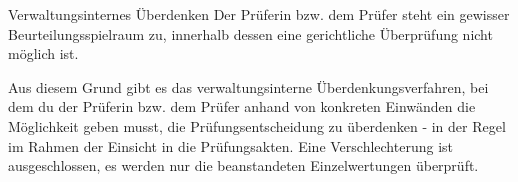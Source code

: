 \begin{artikel}{Verwaltungsinternes Überdenken}
Der Prüferin bzw. dem Prüfer steht ein gewisser Beurteilungsspielraum zu, innerhalb dessen eine gerichtliche Überprüfung nicht möglich ist.

Aus diesem Grund gibt es das verwaltungsinterne Überdenkungsverfahren, bei dem du der Prüferin bzw. dem Prüfer anhand von konkreten Einwänden die Möglichkeit geben musst, die Prüfungsentscheidung zu überdenken - in der Regel im Rahmen der Einsicht in die Prüfungsakten. Eine Verschlechterung ist ausgeschlossen, es werden nur die beanstandeten Einzelwertungen überprüft.
\end{artikel}
